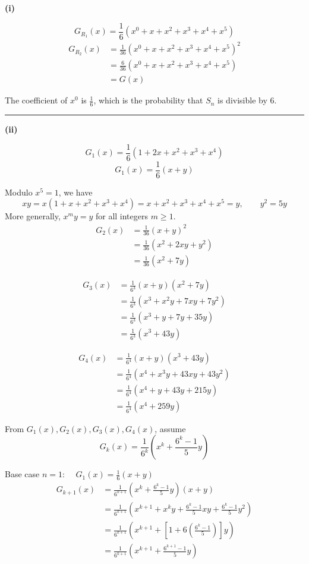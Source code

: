 \documentclass[12pt]{article}
\begin{document}
\newcommand{\ds}{\displaystyle}

\textbf{(i)}

$$G_{R_1}(x)=\frac16(x^0+x+x^2+x^3+x^4+x^5)$$
\begin{align*}
G_{R_2}(x)
&=\frac1{36}(x^0+x+x^2+x^3+x^4+x^5)^2\\
&=\frac6{36}(x^0+x+x^2+x^3+x^4+x^5)\\
&=G(x)
\end{align*}

The coefficient of $x^0$ is $\frac{1}{6}$, which is the probability that $S_n$ is divisible by $6$.
\bigskip\hrule\bigskip

\textbf{(ii)}

$$G_1(x)=\frac16(1+2x+x^2+x^3+x^4)$$
$$G_1(x)=\frac16(x+y)$$

Modulo $x^5=1$, we have
$$xy=x(1+x+x^2+x^3+x^4)=x+x^2+x^3+x^4+x^5=y,\qquad y^2=5y$$
More generally, $x^my=y$ for all integers $m\ge1$.
\begin{align*}
G_2(x)
&=\frac1{36}(x+y)^2\\
&=\frac1{36}(x^2+2xy+y^2)\\
&=\boxed{\frac1{36}(x^2+7y)}
\end{align*}

\begin{align*}
G_3(x)
&=\frac1{6^3}(x+y)(x^2+7y)\\
&=\frac1{6^3}(x^3+x^2y+7xy+7y^2)\\
&=\frac1{6^3}(x^3+y+7y+35y)\\
&=\frac1{6^3}(x^3+43y)
\end{align*}

\begin{align*}
G_4(x)
&=\frac1{6^4}(x+y)(x^3+43y)\\
&=\frac1{6^4}(x^4+x^3y+43xy+43y^2)\\
&=\frac1{6^4}(x^4+y+43y+215y)\\
&=\frac1{6^4}(x^4+259y)
\end{align*}

From $G_1(x),G_2(x),G_3(x),G_4(x)$, assume
$$
G_k(x)=\frac1{6^k}
\left(x^k+\frac{6^k-1}{5}y\right)
$$


Base case $\displaystyle n=1$: $\displaystyle \quad
G_1(x)=\frac16(x+y)
$\\

\begin{align*}
G_{k+1}(x)
&=\frac1{6^{k+1}}
\left(x^k+\frac{6^k-1}{5}y\right)(x+y)\\
&=\frac1{6^{k+1}}
\left(
x^{k+1}
+x^ky
+\frac{6^k-1}{5}xy
+\frac{6^k-1}{5}y^2
\right)\\
&=\frac1{6^{k+1}}
\left(
x^{k+1}
+\left[
1+6\left(\frac{6^k-1}{5}\right)
\right]y
\right)\\
&=\frac1{6^{k+1}}
\left(
x^{k+1}+\frac{6^{k+1}-1}{5}y
\right)
\end{align*}
\end{document}
